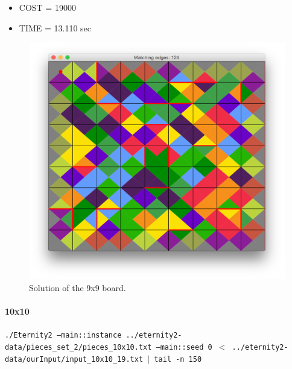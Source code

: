 	\begin{itemize}
		\item COST = 19000
		\item TIME = 13.110 sec
	\end{itemize}
	\begin{figure}[H]
	\centering
	\includegraphics[scale=0.25]{img/sol_09x09}
	\caption{Solution of the 9x9 board.}
	\end{figure}



	\paragraph{10x10}
	\texttt{./Eternity2 --main::instance ../eternity2-data/pieces\_set\_2/pieces\_10x10.txt --main::seed 0 $<$ ../eternity2-data/ourInput/input\_10x10\_19.txt $\mid$ tail -n 150 }

